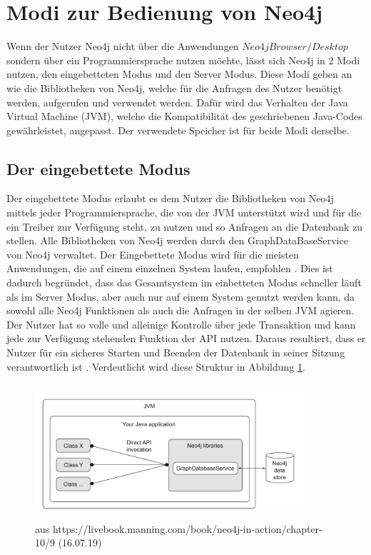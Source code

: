 \section {Modi zur Bedienung von Neo4j}
Wenn der Nutzer Neo4j nicht über die Anwendungen $Neo4j Browser/Desktop$ sondern über ein Programmiersprache nutzen möchte,  lässt sich Neo4j in 2 Modi nutzen, den eingebetteten Modus und den Server Modus. Diese Modi geben an wie die Bibliotheken von Neo4j, welche für die Anfragen des Nutzer benötigt werden, aufgerufen und verwendet werden. Dafür wird das Verhalten der Java Virtual Machine (JVM), welche die Kompatibilität des geschriebenen Java-Codes gewährleistet, angepasst. Der verwendete Speicher ist für beide Modi derselbe.

\subsection{Der eingebettete Modus}
Der eingebettete Modus erlaubt es dem Nutzer die  Bibliotheken von Neo4j mittels jeder Programmiersprache, die von der JVM unterstützt wird und für die ein Treiber zur Verfügung steht, zu nutzen und so Anfragen an die Datenbank zu stellen. Alle Bibliotheken von Neo4j werden durch den GraphDataBaseService von Neo4j verwaltet. Der Eingebettete Modus wird für die meisten Anwendungen, die auf einem einzelnen System laufen, empfohlen \parencite{raj2015neo4j}. Dies ist dadurch begründet, dass das Gesamtsystem im einbetteten Modus schneller läuft als im Server Modus, aber auch nur auf einem System genutzt werden kann, da sowohl alle Neo4j Funktionen als auch die Anfragen in der selben JVM agieren. Der Nutzer hat so volle und alleinige Kontrolle über jede Transaktion und kann jede zur Verfügung stehenden Funktion der API nutzen. Daraus resultiert, dass er Nutzer für ein sicheres Starten und Beenden der Datenbank in seiner Sitzung verantwortlich ist \parencite{robinson2013graph}.  Verdeutlicht wird diese Struktur in Abbildung \ref{fig:Embedded}.
\begin{figure}[!htb]
	\centering	
	\includegraphics [width=10cm, height=5cm]{Figures/embedded}
	\caption[Eingebetteter Modus]{aus https://livebook.manning.com/book/neo4j-in-action/chapter-10/9 (16.07.19)}
	\label{fig:Embedded}
\end{figure}

